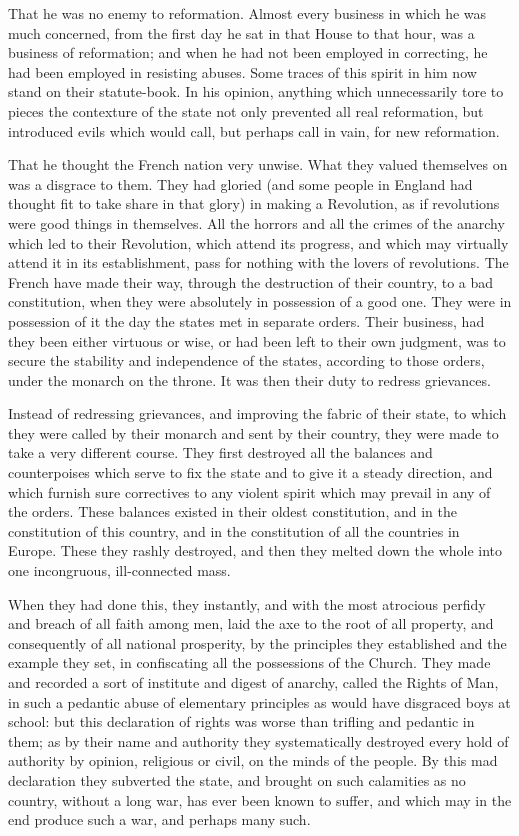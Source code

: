 That he was no enemy to reformation. Almost every business in which he was much concerned, from the first day he sat in that House to that hour, was a business of reformation; and when he had not been employed in correcting, he had been employed in resisting abuses. Some traces of this spirit in him now stand on their statute-book. In his opinion, anything which unnecessarily tore to pieces the contexture of the state not only prevented all real reformation, but introduced evils which would call, but perhaps call in vain, for new reformation.

That he thought the French nation very unwise. What they valued themselves on was a disgrace to them. They had gloried (and some people in England had thought fit to take share in that glory) in making a Revolution, as if revolutions were good things in themselves. All the horrors and all the crimes of the anarchy which led to their Revolution, which attend its progress, and which may virtually attend it in its establishment, pass for nothing with the lovers of revolutions. The French have made their way, through the destruction of their country, to a bad constitution, when they were absolutely in possession of a good one. They were in possession of it the day the states met in separate orders. Their business, had they been either virtuous or wise, or had been left to their own judgment, was to secure the stability and independence of the states, according to those orders, under the monarch on the throne. It was then their duty to redress grievances.

Instead of redressing grievances, and improving the fabric of their state, to which they were called by their monarch and sent by their country, they were made to take a very different course. They first destroyed all the balances and counterpoises which serve to fix the state and to give it a steady direction, and which furnish sure correctives to any violent spirit which may prevail in any of the orders. These balances existed in their oldest constitution, and in the constitution of this country, and in the constitution of all the countries in Europe. These they rashly destroyed, and then they melted down the whole into one incongruous, ill-connected mass.

When they had done this, they instantly, and with the most atrocious perfidy and breach of all faith among men, laid the axe to the root of all property, and consequently of all national prosperity, by the principles they established and the example they set, in confiscating all the possessions of the Church. They made and recorded a sort of institute and digest of anarchy, called the Rights of Man, in such a pedantic abuse of elementary principles as would have disgraced boys at school: but this declaration of rights was worse than trifling and pedantic in them; as by their name and authority they systematically destroyed every hold of authority by opinion, religious or civil, on the minds of the people. By this mad declaration they subverted the state, and brought on such calamities as no country, without a long war, has ever been known to suffer, and which may in the end produce such a war, and perhaps many such.

